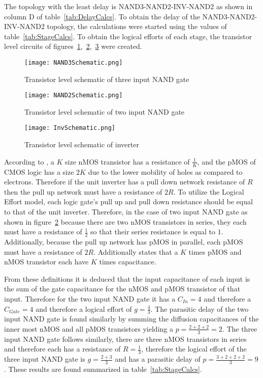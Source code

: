\documentclass[conference]{IEEEtran}
\begin{document}
The topology with the least delay is NAND3-NAND2-INV-NAND2 as shown in column D of table~\ref{tab:DelayCalcs}. To obtain the delay of the NAND3-NAND2-INV-NAND2 topology, the calculations were started using the values of table~\ref{tab:StageCalcs}. To obtain the logical efforts of each stage, the transistor level circuits of figures~\ref{fig:NAND3Schematic},~\ref{fig:NAND2Schematic},~\ref{fig:inverterSchematic} were created. 


  \begin{figure}[H]
  \center
    \texttt{[image: NAND3Schematic.png]}
    \caption{Transistor level schematic of three input NAND gate}
    \label{fig:NAND3Schematic}
  \end{figure}
  \begin{figure}[H]
  \center
    \texttt{[image: NAND2Schematic.png]}
    \caption{Transistor level schematic of two input NAND gate}
    \label{fig:NAND2Schematic}
  \end{figure}
  \begin{figure}[H]
  \center
    \texttt{[image: InvSchematic.png]}
    \caption{Transistor level schematic of inverter}
    \label{fig:inverterSchematic}
  \end{figure}

  According to \cite{weste_harris_2011}, a $K$ size nMOS transistor has a resistance of $\frac{1}{K}$, and the pMOS of CMOS logic has a size $2K$ due to the lower mobility of holes as compared to electrons. Therefore if the unit inverter has a pull down network resistance of $R$ then the pull up network must have a resistance of $2R$. To utilize the Logical Effort model, each logic gate's pull up and pull down resistance should be equal to that of the unit inverter. Therefore, in the case of two input NAND gate as shown in figure~\ref{fig:NAND2Schematic} because there are two nMOS transistors in series, they each must have a resistance of $\frac{1}{2}$ so that their series resistance is equal to $1$. Additionally, because the pull up network has pMOS in parallel, each pMOS must have a resistance of $2R$. Additionally \cite{weste_harris_2011} states that a $K$ times pMOS and nMOS transistor each have $K$ times capacitance. 

  From these definitions it is deduced that the input capacitance of each input is the sum of the gate capacitance for the nMOS and pMOS transistor of that input. Therefore for the two input NAND gate it has a $C_{In} = 4$ and therefore a $C_{Gate} = 4$ and therefore a logical effort of $g = \frac{4}{3}$. The parasitic delay of the two input NAND gate is found similarly by summing the diffusion capacitances of the inner most nMOS and all pMOS transistors yielding a $p = \frac{2+2+2}{3} = {2}$. The three input NAND gate follows similarly, there are three nMOS transistors in series and therefore each has a resistance of $R = \frac{1}{3}$, therefore the logical effort of the three input NAND gate is $g = \frac{2+3}{3}$ and has a parasitic delay of $p =\frac{3+2+2+2}{3} = 9$. These results are found summarized in table~\ref{tab:StageCalcs}.
\end{document}
